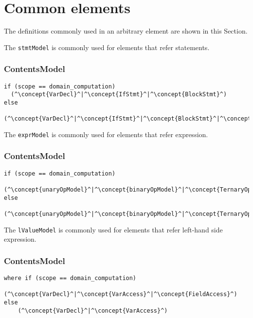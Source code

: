 \section{Common elements}
The definitions commonly used in an arbitrary element are shown in this Section.

The {\tt stmtModel} is commonly used for elements that refer statements.

\subsubsection*{ContentsModel}{}

\begin{lstlisting}[style=default,frame=none]
if (scope == domain_computation)    
  (^\concept{VarDecl}^|^\concept{IfStmt}^|^\concept{BlockStmt}^)
else
  (^\concept{VarDecl}^|^\concept{IfStmt}^|^\concept{BlockStmt}^|^\concept{VerticalRegion}^)
\end{lstlisting}


The {\tt exprModel} is commonly used for elements that refer expression.

\subsubsection*{ContentsModel}{}

\begin{lstlisting}[style=default,frame=none]
if (scope == domain_computation)    
    (^\concept{unaryOpModel}^|^\concept{binaryOpModel}^|^\concept{TernaryOp}^|^\concept{Literal}^|^\concept{FieldAccess}^|^\concept{VarAccess}^|^\concept{FctCall}^|^\irrconcept{NeighbourReduce}^)
else
    (^\concept{unaryOpModel}^|^\concept{binaryOpModel}^|^\concept{TernaryOp}^|^\concept{VarAccess}^|^\concept{Literal}^|^\concept{FctCall}^)
\end{lstlisting}


The {\tt lValueModel} is commonly used for elements that refer left-hand side
expression.

\subsubsection*{ContentsModel}{}

\begin{lstlisting}[style=default,frame=none]
where if (scope == domain_computation)    
    (^\concept{VarDecl}^|^\concept{VarAccess}^|^\concept{FieldAccess}^)
else
    (^\concept{VarDecl}^|^\concept{VarAccess}^)
\end{lstlisting}


